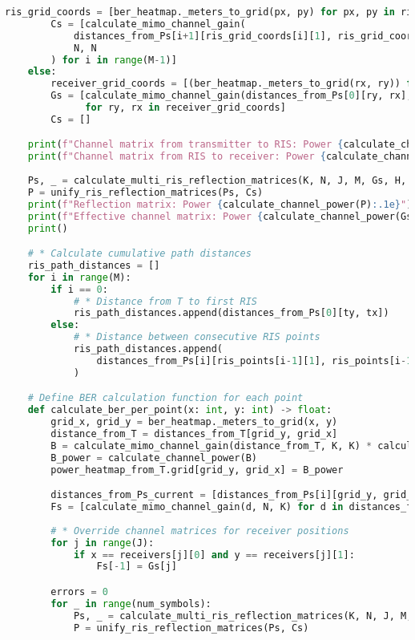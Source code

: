 \begin{lstlisting}[language=python, caption={BER Heatmap Simulation}]
        ris_grid_coords = [ber_heatmap._meters_to_grid(px, py) for px, py in ris_points]
        Cs = [calculate_mimo_channel_gain(
            distances_from_Ps[i+1][ris_grid_coords[i][1], ris_grid_coords[i][0]], 
            N, N
        ) for i in range(M-1)]
    else:
        receiver_grid_coords = [(ber_heatmap._meters_to_grid(rx, ry)) for rx, ry in receivers]
        Gs = [calculate_mimo_channel_gain(distances_from_Ps[0][ry, rx], N, K) 
              for ry, rx in receiver_grid_coords]
        Cs = []

    print(f"Channel matrix from transmitter to RIS: Power {calculate_channel_power(H):.1e}")
    print(f"Channel matrix from RIS to receiver: Power {calculate_channel_power(Gs[0]):.1e}")
    
    Ps, _ = calculate_multi_ris_reflection_matrices(K, N, J, M, Gs, H, eta, Cs)
    P = unify_ris_reflection_matrices(Ps, Cs)
    print(f"Reflection matrix: Power {calculate_channel_power(P):.1e}")
    print(f"Effective channel matrix: Power {calculate_channel_power(Gs[0] @ P @ H):.1e}")
    print()

    # * Calculate cumulative path distances
    ris_path_distances = []
    for i in range(M):
        if i == 0:
            # * Distance from T to first RIS
            ris_path_distances.append(distances_from_Ps[0][ty, tx])
        else:
            # * Distance between consecutive RIS points
            ris_path_distances.append(
                distances_from_Ps[i][ris_points[i-1][1], ris_points[i-1][0]]
            )

    # Define BER calculation function for each point
    def calculate_ber_per_point(x: int, y: int) -> float:
        grid_x, grid_y = ber_heatmap._meters_to_grid(x, y)
        distance_from_T = distances_from_T[grid_y, grid_x]
        B = calculate_mimo_channel_gain(distance_from_T, K, K) * calculate_free_space_path_loss(distance_from_T)
        B_power = calculate_channel_power(B)
        power_heatmap_from_T.grid[grid_y, grid_x] = B_power

        distances_from_Ps_current = [distances_from_Ps[i][grid_y, grid_x] for i in range(M)]
        Fs = [calculate_mimo_channel_gain(d, N, K) for d in distances_from_Ps_current]
        
        # * Override channel matrices for receiver positions
        for j in range(J):
            if x == receivers[j][0] and y == receivers[j][1]:
                Fs[-1] = Gs[j]

        errors = 0
        for _ in range(num_symbols):
            Ps, _ = calculate_multi_ris_reflection_matrices(K, N, J, M, Gs, H, eta, Cs)
            P = unify_ris_reflection_matrices(Ps, Cs)


\end{lstlisting}
